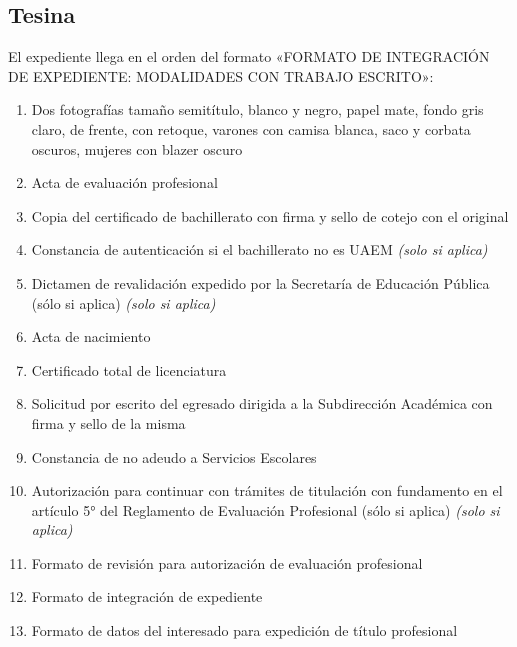 \subsection{Tesina}
El expediente llega en el orden del formato «FORMATO DE INTEGRACIÓN DE EXPEDIENTE: MODALIDADES CON TRABAJO ESCRITO»:
\begin{enumerate}
  \item Dos fotografías tamaño semitítulo, blanco y negro, papel mate, fondo gris claro, de frente, con retoque, varones con camisa blanca, saco y corbata oscuros, mujeres con blazer oscuro
  \item Acta de evaluación profesional
  \item Copia del certificado de bachillerato con firma y sello de cotejo con el original
  \item Constancia de autenticación si el bachillerato no es UAEM \emph{(solo si aplica)}
  \item Dictamen de revalidación expedido por la Secretaría de Educación Pública (sólo si aplica) \emph{(solo si aplica)}
  \item Acta de nacimiento
  \item Certificado total de licenciatura
  \item Solicitud por escrito del egresado dirigida a la Subdirección Académica con firma y sello de la misma
  \item Constancia de no adeudo a Servicios Escolares
  \item Autorización para continuar con trámites de titulación con fundamento en el artículo 5° del Reglamento de Evaluación Profesional (sólo si aplica) \emph{(solo si aplica)}
  \item Formato de revisión para autorización de evaluación profesional
  \item Formato de integración de expediente
  \item Formato de datos del interesado para expedición de título profesional
\end{enumerate}

